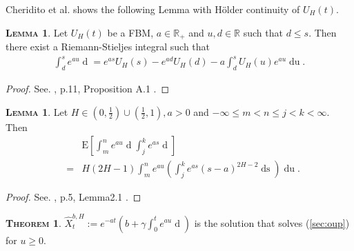 \documentclass[a4paper, twoside, 11pt]{article}
\theoremstyle{definition}
\newtheorem{theorem}[definition]{\scshape Theorem}
\newtheorem{lemma}[definition]{\scshape Lemma}
\newcommand{\brkt}[1]{\left({#1} \right)}
\begin{document}
Cheridito et al.\cite{chriel} shows the following Lemma with H\"older continuity of $U_H(t)$.
\begin{lemma}
  Let $U_H(t)$ be a FBM, $a \in \mathbb{R}_+$ and $u, d\in \mathbb{R}$ such that $d\le s$. Then there exist a Riemann-Stieljes integral such that 
  \begin{eqnarray}
	\int_d^s e^{au} \mathop{dU_H(u)} = e^{as} U_H(s) - e^{ad} U_H(d) - a\int_d^s U_H(u) e^{au}\mathop{du}.
	\label{sec:rie}
  \end{eqnarray}
\end{lemma}

\begin{proof}
  See. \cite{chriel}, p.11, Proposition A.1 .
\end{proof}

\begin{lemma}
  Let $H \in (0, \frac{1}{2}) \cup (\frac{1}{2}, 1), a >0$ and $-\infty\le m < n \le j < k < \infty.$ Then 
  \begin{eqnarray*}
	&&\mathrm{E}[\int_m^n e^{au}\mathop{dU_H(u)}\int_j^k e^{as}\mathop{dU_H(s)}]\\
	&=& H(2H-1)\int_m^n e^{au} \brkt{\int_j^k e^{as}(s-a)^{2H-2}\mathop{ds}}\mathop{du}.
\end{eqnarray*}
  \label{sec:lemma2}
\end{lemma}

\begin{proof}
  See. \cite{chriel}, p.5, Lemma2.1 .
\end{proof}

\begin{theorem}
  $\hat{X}^{b,H}_t := e^{-at} \brkt{b + \gamma\int_0^t e^{au}\mathop{dU_H(u)}}$ is the solution that solves (\ref{sec:oup}) for $u\ge 0$.
  \label{sec:sol}
\end{theorem}
\end{document}
